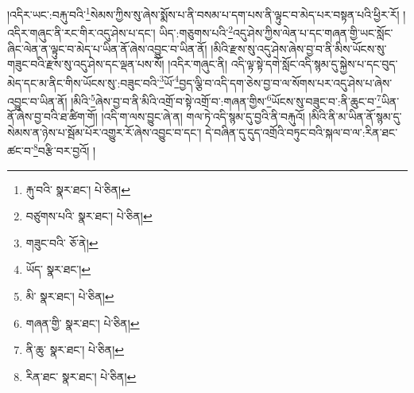 །འདིར་ཡང་:བརྐུ་བའི་\footnote{རྐུ་བའི་  སྣར་ཐང་།  པེ་ཅིན། }སེམས་ཀྱིས་སུ་ཞེས་སྨོས་པ་ནི་བསམ་པ་དག་པས་ནི་ལྟུང་བ་མེད་པར་བསྟན་པའི་ཕྱིར་རོ། །འདིར་གཞུང་ནི་རང་གིར་འདུ་ཤེས་པ་དང་། ཡིད་:གཅུགས་པའི་\footnote{བཙུགས་པའི་  སྣར་ཐང་།  པེ་ཅིན། }འདུ་ཤེས་ཀྱིས་ལེན་པ་དང་གཞན་གྱི་ཡང་སློང་ཞིང་ལེན་ན་ལྟུང་བ་མེད་པ་ཡིན་ནོ་ཞེས་འབྱུང་བ་ཡིན་ནོ། །མིའི་རྫས་སུ་འདུ་ཤེས་ཞེས་བྱ་བ་ནི་མིས་ཡོངས་སུ་གཟུང་བའི་རྫས་སུ་འདུ་ཤེས་དང་ལྡན་པས་སོ། །འདིར་གཞུང་ནི། འདི་ལྟ་སྟེ་དགེ་སློང་འདི་སྙམ་དུ་སྐྱེས་པ་དང་བུད་མེད་དང་མ་ནིང་གིས་ཡོངས་སུ་:བཟུང་བའི་\footnote{གཟུང་བའི་  ཅོ་ནེ། }ཡོ་\footnote{ཡོད་  སྣར་ཐང་། }བྱད་ལྕི་བ་འདི་དག་ཅེས་བྱ་བ་ལ་སོགས་པར་འདུ་ཤེས་པ་ཞེས་འབྱུང་བ་ཡིན་ནོ། །མིའི་\footnote{མི་  སྣར་ཐང་།  པེ་ཅིན། }ཞེས་བྱ་བ་ནི་མིའི་འགྲོ་བ་སྟེ་འགྲོ་བ་:གཞན་གྱིས་\footnote{གཞན་གྱི་  སྣར་ཐང་།  པེ་ཅིན། }ཡོངས་སུ་བཟུང་བ་:ནི་ཆུང་བ་\footnote{ནི་ཆུ་  སྣར་ཐང་།  པེ་ཅིན། }ཡིན་ནོ་ཞེས་བྱ་བའི་ཐ་ཚིག་གོ། །འདི་ག་ལས་བྱུང་ཞེ་ན། གལ་ཏེ་འདི་སྙམ་དུ་བྱའི་ནི་བརྐུའོ། །མིའི་ནི་མ་ཡིན་ནོ་སྙམ་དུ་སེམས་ན་ཉེས་པ་སྦོམ་པོར་འགྱུར་རོ་ཞེས་འབྱུང་བ་དང་། དེ་བཞིན་དུ་དུད་འགྲོའི་བཏུང་བའི་སྐལ་བ་ལ་:རིན་ཐང་ཚང་བ་\footnote{རིན་ཐང་  སྣར་ཐང་།  པེ་ཅིན། }བརྩི་བར་བྱའོ། །
